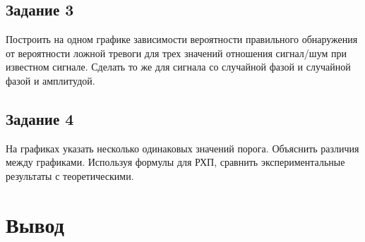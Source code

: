 \subsection{Задание 3}
Построить на одном графике зависимости вероятности правильного
обнаружения от вероятности ложной тревоги для трех значений
отношения сигнал/шум при известном сигнале. Сделать то же для сигнала
со случайной фазой и случайной фазой и амплитудой. 

\subsection{Задание 4}
На графиках указать несколько одинаковых значений порога. Объяснить
различия между графиками. Используя формулы для РХП, сравнить
экспериментальные результаты с теоретическими.
\section{Вывод}


